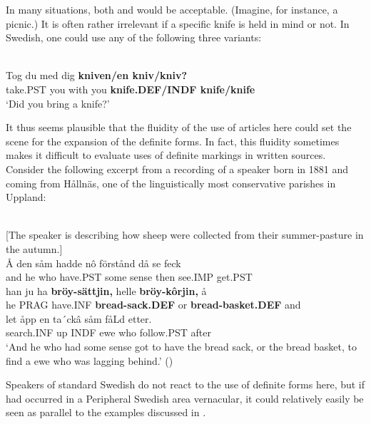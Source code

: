 In many situations, both  and  would be acceptable. (Imagine, for instance, a picnic.) It is often rather irrelevant if a specific knife is held in mind or not. In Swedish, one could use any of the following three variants:

\ea \label{} 
\\
\gll Tog  du  med  dig  \textbf{kniven/en kniv/kniv?}\\
take.PST  you  with  you  \textbf{knife.DEF/INDF knife/knife}\\
\glt ‘Did you bring a knife?’

\z

It thus seems plausible that the fluidity of the use of articles here could set the scene for the expansion of the definite forms. In fact, this fluidity sometimes makes it difficult to evaluate uses of definite markings in written sources. Consider the following excerpt from a recording of a speaker born in 1881 and coming from Hållnäs, one of the linguistically most conservative parishes in Uppland:

\ea \label{} 
\\
{}[The speaker is describing how sheep were collected from their summer-pasture in the autumn.]\\
\gll 	Å  den  såm  hadde  nô  förstånd  då  se  feck\\
		and  he  who  have.PST  some  sense  then  see.IMP  get.PST\\
\gll 	han  ju  ha  \textbf{bröy-sättjin,} helle  \textbf{bröy-kôrjin,} å\\
		he  PRAG  have.INF  \textbf{bread-sack.DEF} or  \textbf{bread-basket.DEF} and\\
\gll 	le{\textasciigrave}t  åpp  en  ta´ckâ  såm  fåLd  etter.\\
		search.INF  up  INDF  ewe  who  follow.PST  after\\
\glt  ‘And he who had some sense got to have the bread sack, or the bread basket, to find a ewe who was lagging behind.’ (\citet[33]{KällskogEtAl1993})

\z

Speakers of standard Swedish do not react to the use of definite forms here, but if  had occurred in a Peripheral Swedish area vernacular, it could relatively easily be seen as parallel to the examples discussed in .

